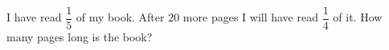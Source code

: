 I have read \(\dfrac{1}{5}\) of my book. After \(20\) more pages I will have read \(\dfrac{1}{4}\) of it. How many pages long is the book?
